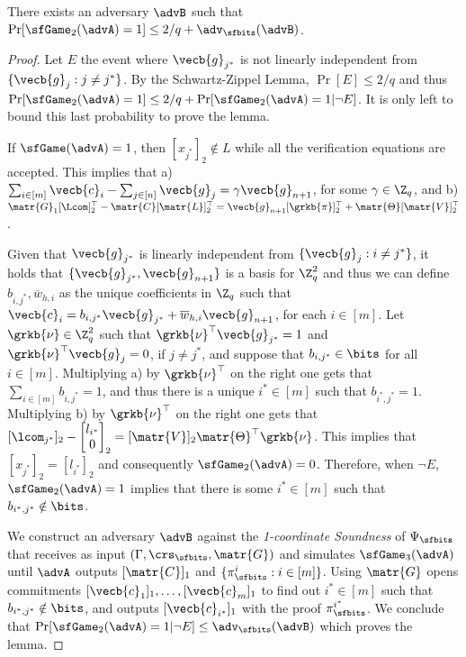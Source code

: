\begin{lemma}
There exists an adversary $\advB$ such that $\Pr[\sfGame_2(\advA)=1]\leq2/q+\adv_{\sfbits}(\advB)$.
\end{lemma}

\begin{proof}
Let $E$ the event where $\vecb{g}_{j^*}$ is not linearly independent from $\{\vecb{g}_{j}:j\neq j^*\}$.
By the Schwartz-Zippel Lemma, $\Pr[E]\leq 2/q$ and thus $\Pr[\sfGame_2(\advA)=1]\leq2/q+\Pr[\sfGame_2(\advA)=1|\neg E]$. It is only left to bound this last probability to prove the lemma. 

If $\sfGame(\advA)=1$, then $[x_{j^*}]_2\notin L$ while all the verification equations are accepted. This implies that a) $\sum_{i\in[m]}\vecb{c}_i-\sum_{j\in[n]}\vecb{g}_j=\gamma\vecb{g}_{n+1}$, for some $\gamma\in\Z_q$, and b) $\matr{G}_1[\Lcom]_2^\top-\matr{C}[\matr{L}]_2^\top=\vecb{g}_{n+1}[\grkb{\pi}]_2^\top+\matr{\Theta}[\matr{V}]_2^\top$.

Given that $\vecb{g}_{j^*}$ is linearly independent from $\{\vecb{g}_{j}:i\neq j^*\}$, it holds that $\{\vecb{g}_{j^*},\vecb{g}_{n+1}\}$ is a basis for $\Z_q^2$ and thus we can define $b_{i,j^*},\overline{w}_{h,i}$ as the unique coefficients in $\Z_q$ such that $\vecb{c}_i = b_{i,j^*}\vecb{g}_{j^*}+\overline{w}_{h,i}\vecb{g}_{n+1}$, for each $i\in[m]$. Let $\grkb{\nu}\in\Z_q^2$ such that $\grkb{\nu}^\top\vecb{g}_{j^*}=1$ and $\grkb{\nu}^\top\vecb{g}_{j}=0$, if $j\neq j^*$, and suppose that $b_{i,j^*}\in\bits$ for all $i\in[m]$. Multiplying a) by $\grkb{\nu}^\top$ on the right one gets that $\sum_{i\in[m]}b_{i,j^*}=1$, and thus there is a unique $i^*\in[m]$ such that $b_{i^*,j^*}=1$. Multiplying b) by $\grkb{\nu}^\top$ on the right one gets that $[\lcom_{j^*}]_2-\begin{bmatrix}l_{i^*}\\0\end{bmatrix}_2=[\matr{V}]_2\matr{\Theta}^\top\grkb{\nu}$. This implies that $[x_{j^*}]_2=[l_{i^*}]_2$ and consequently $\sfGame_2(\advA)=0$. Therefore, when $\neg E$, $\sfGame_2(\advA)=1$ implies that there is some $i^*\in[m]$ such that $b_{i^*,j^*}\notin\bits$.

We construct an adversary $\advB$ against the \emph{1-coordinate Soundness} of $\Psi_\sfbits$ that receives as input $(\Gamma, \crs_\sfbits,\matr{G})$  and simulates $\sfGame_3(\advA)$ until $\advA$ outputs $[\matr{C}]_1$ and $\{\pi^i_\sfbits:i\in[m]\}$. Using $\matr{G}$ opens commitments $[\vecb{c}_1]_1,\ldots,[\vecb{c}_m]_1$ to find out $i^*\in[m]$ such that $b_{i^*,j^*}\notin\bits$, and outputs $[\vecb{c}_{i^*}]_1$  with the proof $\pi^{i^*}_\sfbits$. We conclude that $\Pr[\sfGame_2(\advA)=1|\neg E]\leq \adv_{\sfbits}(\advB)$ which proves the lemma.
\end{proof}

